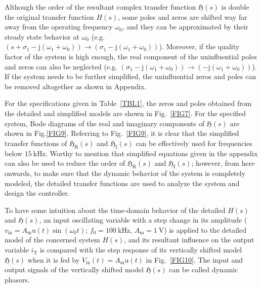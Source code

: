 \documentclass[journal,a4paper,10pt,twoside]{IEEEtran} %
\begin{document}
	 Although the order of the resultant complex transfer function $\mathfrak{H}(s)$ is double the original transfer function $\mathit{H}(s)$, some poles and zeros are shifted way far away from the operating frequency $\omega_0$, and they can be approximated by their steady state behavior at $\omega_0$ (e.g. $(s+\sigma_1-\mathrm{j}(\omega_1+\omega_0))\rightarrow(\sigma_1-\mathrm{j}(\omega_1+\omega_0))$). Moreover, if the quality factor of the system is high enough, the real component of the uninfluential poles and zeros can also be neglected (e.g.
	 $(\sigma_1-\mathrm{j}(\omega_1+\omega_0))\rightarrow(-\mathrm{j}(\omega_1+\omega_0))$).
	 If the system needs to be further simplified, the uninfluential zeros and poles can be removed altogether as shown in Appendix.
	 
	 For the specifications given in Table~\ref{TBL1}, the zeros and poles obtained from the detailed and simplified models are shown in Fig.~\ref{FIG7}. For the specified system, 
	 Bode diagrams of the real and imaginary components of $\mathfrak{H}(s)$ are shown in Fig.\ref{FIG9}. Referring to Fig.~\ref{FIG9}, it is clear that the simplified transfer functions of $\mathfrak{H}_\mathrm{R}(s)$ and $\mathfrak{H}_\mathrm{I}(s)$ can be effectively used for frequencies below  $15~\mathrm{kHz}$. 
	 Worthy to mention that simplified equations given in the appendix can also be used to reduce the order of $\mathfrak{H}_\mathrm{R}(s)$ and $\mathfrak{H}_\mathrm{I}(s)$; however, from here onwards, to make sure that the dynamic behavior of the system is completely modeled, the detailed transfer functions are used to analyze the system and design the controller. 
	 
	 To have some intuition about the time-domain behavior of the detailed $\mathit{H}(s)$ and $\mathfrak{H}(s)$, an input oscillating variable with a step change in its amplitude ($v_\mathrm{in}=A_\mathrm{m}\mathrm{u}(t)\sin{(\omega_0 t)}$; $f_0=\mathrm{100~\mathrm{kHz}}$, $A_\mathrm{m}=1~\mathrm{V}$) is applied to the detailed model of the concerned system $\mathit{H}(s)$, and its resultant influence on the output variable $i_\mathrm{T}$ is compared with the step response of its vertically shifted model $\mathfrak{H}(s)$ when it is fed by $V_\mathrm{in}(t)=A_\mathrm{m}\mathrm{u}(t)$ in Fig.~\ref{FIG10}. The input and output signals of the vertically shifted model $\mathfrak{H}(s)$ can be called dynamic phasors.
	 
\end{document}
